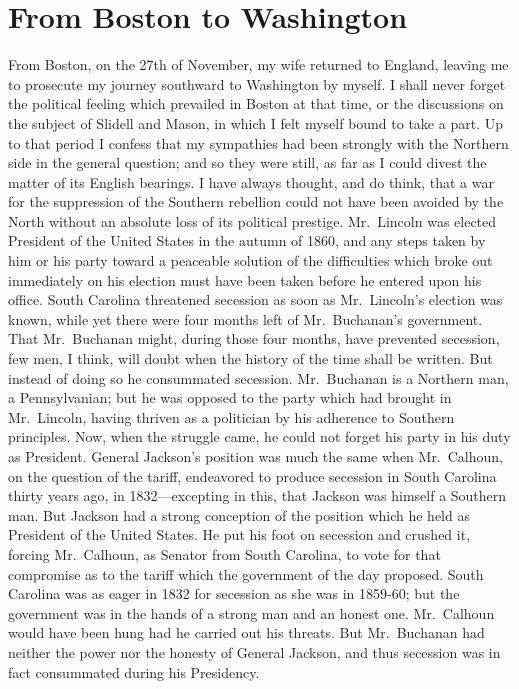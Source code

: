\chapter{From Boston to Washington}


From Boston, on the 27th of November, my wife returned to England,
leaving me to prosecute my journey southward to Washington by
myself.  I shall never forget the political feeling which prevailed
in Boston at that time, or the discussions on the subject of
Slidell and Mason, in which I felt myself bound to take a part.  Up
to that period I confess that my sympathies had been strongly with
the Northern side in the general question; and so they were still,
as far as I could divest the matter of its English bearings.  I
have always thought, and do think, that a war for the suppression
of the Southern rebellion could not have been avoided by the North
without an absolute loss of its political prestige.  Mr.\ Lincoln
was elected President of the United States in the autumn of 1860,
and any steps taken by him or his party toward a peaceable solution
of the difficulties which broke out immediately on his election
must have been taken before he entered upon his office.  South
Carolina threatened secession as soon as Mr.\ Lincoln's election was
known, while yet there were four months left of Mr.\ Buchanan's
government.  That Mr.\ Buchanan might, during those four months,
have prevented secession, few men, I think, will doubt when the
history of the time shall be written.  But instead of doing so he
consummated secession.  Mr.\ Buchanan is a Northern man, a
Pennsylvanian; but he was opposed to the party which had brought in
Mr.\ Lincoln, having thriven as a politician by his adherence to
Southern principles.  Now, when the struggle came, he could not
forget his party in his duty as President.  General Jackson's
position was much the same when Mr.\ Calhoun, on the question of the
tariff, endeavored to produce secession in South Carolina thirty
years ago, in 1832---excepting in this, that Jackson was himself a
Southern man.  But Jackson had a strong conception of the position
which he held as President of the United States.  He put his foot
on secession and crushed it, forcing Mr.\ Calhoun, as Senator from
South Carolina, to vote for that compromise as to the tariff which
the government of the day proposed.  South Carolina was as eager in
1832 for secession as she was in 1859-60; but the government was in
the hands of a strong man and an honest one.  Mr.\ Calhoun would
have been hung had he carried out his threats.  But Mr.\ Buchanan
had neither the power nor the honesty of General Jackson, and thus
secession was in fact consummated during his Presidency.

